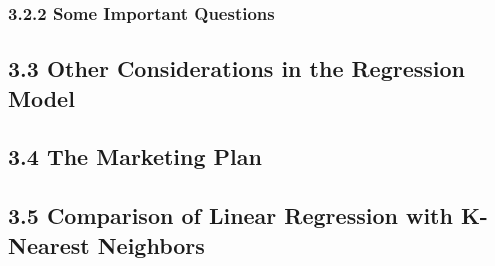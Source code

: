         
        \subsubsection*{3.2.2 Some Important Questions}\label{some-important-questions}
        
        \subsection*{3.3 Other Considerations in the Regression Model}\label{other-considerations-in-the-regression-model}
        
        \subsection*{3.4 The Marketing Plan}\label{the-marketing-plan}
        
        \subsection*{3.5 Comparison of Linear Regression with K-Nearest Neighbors}\label{comparison-of-linear-regression-with-k-nearest-neighbors}
        
    
